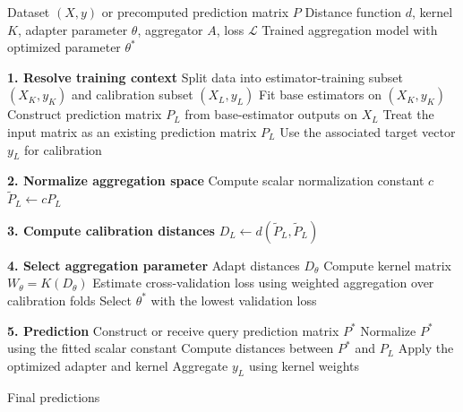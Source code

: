 \begin{algorithm}[H]
    \caption{COBRA-Style Training and Prediction Pipeline}
    \label{alg:gradientcobra}
    \begin{algorithmic}[1]

        \Require Dataset $(X,y)$ or precomputed prediction matrix $P$
        \Require Distance function $d$, kernel $K$, adapter parameter $\theta$, aggregator $A$, loss $\mathcal{L}$
        \Ensure Trained aggregation model with optimized parameter $\theta^*$

        \State \textbf{1. Resolve training context}
        \State Split data into estimator-training subset $(X_K,y_K)$ and calibration subset $(X_L,y_L)$
        \State Fit base estimators on $(X_K,y_K)$
        \State Construct prediction matrix $P_L$ from base-estimator outputs on $X_L$
        \Else
        \State Treat the input matrix as an existing prediction matrix $P_L$
        \State Use the associated target vector $y_L$ for calibration
        \EndIf

        \State \textbf{2. Normalize aggregation space}
        \State Compute scalar normalization constant $c$
        \State $\tilde{P}_L \leftarrow cP_L$

        \State \textbf{3. Compute calibration distances}
        \State $D_L \leftarrow d(\tilde{P}_L,\tilde{P}_L)$

        \State \textbf{4. Select aggregation parameter}
        \State Adapt distances $D_{\theta}$
        \State Compute kernel matrix $W_{\theta} = K(D_{\theta})$
        \State Estimate cross-validation loss using weighted aggregation over calibration folds
        \EndFor
        \State Select $\theta^*$ with the lowest validation loss

        \State \textbf{5. Prediction}
        \State Construct or receive query prediction matrix $P^*$
        \State Normalize $P^*$ using the fitted scalar constant
        \State Compute distances between $P^*$ and $P_L$
        \State Apply the optimized adapter and kernel
        \State Aggregate $y_L$ using kernel weights

        \State \Return Final predictions

    \end{algorithmic}
\end{algorithm}




